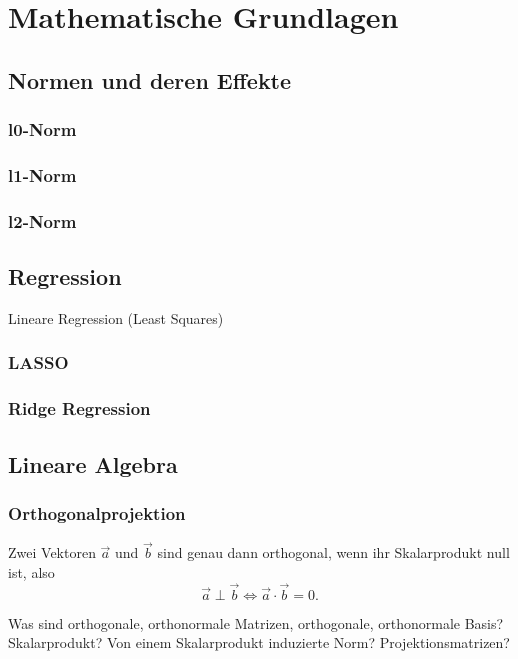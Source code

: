 \chapter{Mathematische Grundlagen}

\label{fundamentals}

\section{Normen und deren Effekte}

\subsection{l0-Norm}
\subsection{l1-Norm}
\subsection{l2-Norm}

\section{Regression}
Lineare Regression (Least Squares)
\subsection{LASSO}
\subsection{Ridge Regression}

\section{Lineare Algebra}

\subsection{Orthogonalprojektion}
\begin{defn}
Zwei Vektoren $\vec a$ und $\vec b$ sind genau dann orthogonal, wenn ihr Skalarprodukt null ist, also
$$\vec a \perp \vec b \iff\vec a \cdot \vec b = 0.$$
\end{defn}

Was sind orthogonale, orthonormale Matrizen, orthogonale, orthonormale Basis?
Skalarprodukt?
Von einem Skalarprodukt induzierte Norm?
Projektionsmatrizen?

